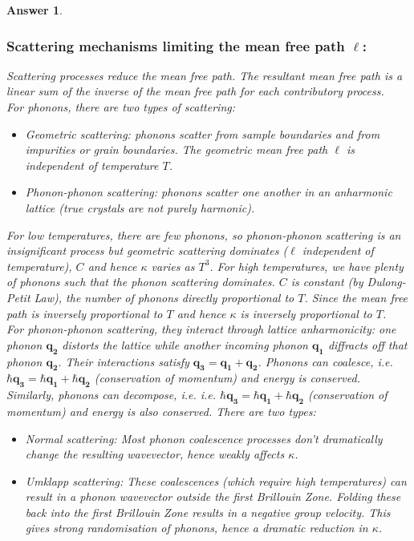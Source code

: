 \documentclass[a4paper]{article}
\newtheorem{ans}{Answer}[subsection]
\theoremstyle{new}
\begin{document}
\begin{ans}
\subsubsection*{Scattering mechanisms limiting the mean free path $\ell$:}
Scattering processes reduce the mean free path. The resultant mean free path is a linear sum of the inverse of the mean free path for each contributory process.\\[5pt]
For phonons, there are two types of scattering:
\begin{itemize}
    \item Geometric scattering: phonons scatter from sample boundaries and from impurities or grain boundaries. The geometric mean free path $\ell$ is independent of temperature $T$.
    \item Phonon-phonon scattering: phonons scatter one another in an anharmonic lattice (true crystals are not purely harmonic). 
\end{itemize}
For low temperatures, there are few phonons, so phonon-phonon scattering is an insignificant process but geometric scattering dominates ($\ell$ independent of temperature), $C$ and hence $\kappa$ varies as $T^3$. For high temperatures, we have plenty of phonons such that the phonon scattering dominates. $C$ is constant (by Dulong-Petit Law), the number of phonons directly proportional to $T$. Since the mean free path is inversely proportional to $T$ and hence $\kappa$ is inversely proportional to $T$.\\[5pt]
For phonon-phonon scattering, they interact through lattice anharmonicity: one phonon $\mathbf{q_2}$ distorts the lattice while another incoming phonon $\mathbf{q_1}$ diffracts off that phonon $\mathbf{q_2}$. Their interactions satisfy $\mathbf{q_3}=\mathbf{q_1}+\mathbf{q_2}$. Phonons can coalesce, i.e. $\hbar\mathbf{q_3}=\hbar\mathbf{q_1}+\hbar\mathbf{q_2}$ (conservation of momentum) and energy is conserved. Similarly, phonons can decompose, i.e. i.e. $\hbar\mathbf{q_3}=\hbar\mathbf{q_1}+\hbar\mathbf{q_2}$ (conservation of momentum) and energy is also conserved. There are two types:
\begin{itemize}
\item Normal scattering: Most phonon coalescence processes don't dramatically change the resulting wavevector, hence weakly affects $\kappa$.
\item Umklapp scattering: These coalescences (which require high temperatures) can result in a phonon wavevector outside the first Brillouin Zone. Folding these back into the first Brillouin Zone results in a negative group velocity. This gives strong randomisation of phonons, hence a dramatic reduction in $\kappa$.

\end{itemize}
\end{ans}
\end{document}
